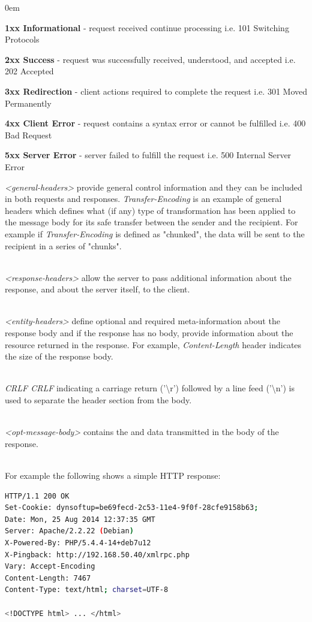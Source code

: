 \documentclass[a4paper,11pt,twoside]{article}
\begin{document}
\begin{list}{-}{}
\itemsep0em
\item \textbf{1xx Informational} - request received continue processing i.e. 101 Switching Protocols
\item \textbf{2xx Success} - request was successfully received, understood, and accepted i.e. 202 Accepted
\item \textbf{3xx Redirection} - client actions required to complete the request i.e. 301 Moved Permanently
\item \textbf{4xx Client Error} - request contains a syntax error or cannot be fulfilled i.e. 400 Bad Request
\item \textbf{5xx Server Error} - server failed to fulfill the request i.e. 500 Internal Server Error
\end{list}
\noindent
\textit{<general-headers>} provide general control information and they can be included in both requests and responses. \textit{Transfer-Encoding} is an example of general headers which defines what (if any) type of transformation has been applied to the message body for its safe transfer between the sender and the recipient. For example if \textit{Transfer-Encoding} is defined as "chunked", the data will be sent to the recipient in a series of "chunks". 

\noindent\\
\textit{<response-headers>} allow the server to pass additional information about the response, and about the server itself, to the client. 

\noindent\\
\textit{<entity-headers>} define optional and required meta-information about the response body and if the response has no body, provide information about the resource returned in the response. For example, \textit{Content-Length} header indicates the size of the response body. 

\noindent\\
\textit{CRLF CRLF} indicating a carriage return ('\textbackslash r') followed by a line feed ('\textbackslash n') is used to separate the header section from the body. 

\noindent\\
\textit{<opt-message-body>} contains the and data transmitted in the body of the response.

\noindent\\
For example the following shows a simple HTTP response:

\indent
\begin{lstlisting}[language=bash,xleftmargin=.25in,xrightmargin=.25in]
HTTP/1.1 200 OK
Set-Cookie: dynsoftup=be69fecd-2c53-11e4-9f0f-28cfe9158b63;
Date: Mon, 25 Aug 2014 12:37:35 GMT
Server: Apache/2.2.22 (Debian)
X-Powered-By: PHP/5.4.4-14+deb7u12
X-Pingback: http://192.168.50.40/xmlrpc.php
Vary: Accept-Encoding
Content-Length: 7467
Content-Type: text/html; charset=UTF-8

<!DOCTYPE html> ... </html>
\end{lstlisting} 
\end{document}
